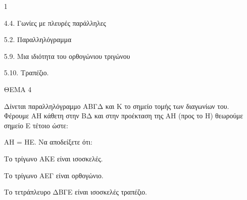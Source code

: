 \begin{ylh}{1}
    \item 4.4. Γωνίες με πλευρές παράλληλες
    \item 5.2. Παραλληλόγραμμα
    \item 5.9. Μια ιδιότητα του ορθογώνιου τριγώνου
    \item 5.10. Τραπέζιο.
\end{ylh}

ΘΕΜΑ 4

Δίνεται παραλληλόγραμμο ΑΒΓΔ και Κ το σημείο τομής των διαγωνίων του. Φέρουμε ΑΗ κάθετη στην ΒΔ και στην προέκταση της ΑΗ (προς το Η) θεωρούμε σημείο Ε τέτοιο ώστε:

ΑΗ = ΗΕ. Να αποδείξετε ότι:

\begin{alist}
\item Το τρίγωνο ΑΚΕ είναι ισοσκελές. 

\item Το τρίγωνο ΑΕΓ είναι ορθογώνιο. 

\item Το τετράπλευρο ΔΒΓΕ είναι ισοσκελές τραπέζιο. 


\end{alist}
